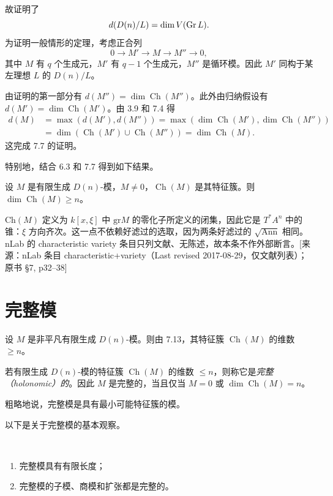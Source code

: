 故证明了
$$d(D(n)/L)=\dim V(\operatorname{Gr} L).$$
为证明一般情形的定理，考虑正合列
$$0\longrightarrow M'\longrightarrow M\longrightarrow M''\longrightarrow 0,$$
其中 $M$ 有 $q$ 个生成元，$M'$ 有 $q-1$ 个生成元，$M''$ 是循环模。因此 $M'$ 同构于某左理想 $L$ 的 $D(n)/L$。

由证明的第一部分有 $d(M'')=\dim\operatorname{Ch}(M'')$。此外由归纳假设有 $d(M')=\dim\operatorname{Ch}(M')$。由 3.9 和 7.4 得
\begin{align*}
d(M)&=\max(d(M'),d(M''))=\max(\dim\operatorname{Ch}(M'),\dim\operatorname{Ch}(M''))\\
&=\dim(\operatorname{Ch}(M')\cup\operatorname{Ch}(M''))=\dim\operatorname{Ch}(M).
\end{align*}
这完成 7.7 的证明。

特别地，结合 6.3 和 7.7 得到如下结果。

\begin{theorem}
设 $M$ 是有限生成 $D(n)$-模，$M\neq 0$，$\operatorname{Ch}(M)$ 是其特征簇。则 $\dim\operatorname{Ch}(M)\ge n$。
\end{theorem}
\begin{annote}
$\mathrm{Ch}(M)$ 定义为 $k[x,\xi]$ 中 $\mathrm{gr}M$ 的零化子所定义的闭集，因此它是 $T^*A^n$ 中的锥：$\xi$ 方向齐次。这一点不依赖好滤过的选取，因为两条好滤过的 $\sqrt{\mathrm{Ann}}$ 相同。nLab 的 characteristic variety 条目只列文献、无陈述，故本条不作外部断言。[来源：nLab 条目 characteristic+variety（Last revised 2017-08-29，仅文献列表）；原书 §7, p32–38]
\end{annote}



\section{完整模}

设 $M$ 是非平凡有限生成 $D(n)$-模。则由 7.13，其特征簇 $\operatorname{Ch}(M)$ 的维数 $\ge n$。

若有限生成 $D(n)$-模的特征簇 $\operatorname{Ch}(M)$ 的维数 $\le n$，则称它是\emph{完整（holonomic）的}。因此 $M$ 是完整的，当且仅当 $M=0$ 或 $\dim\operatorname{Ch}(M)=n$。

粗略地说，完整模是具有最小可能特征簇的模。

以下是关于完整模的基本观察。

\begin{theorem}\ 
\begin{enumerate}[label=(\roman*)]
  \item 完整模具有有限长度；
  \item 完整模的子模、商模和扩张都是完整的。
\end{enumerate}
\end{theorem}

